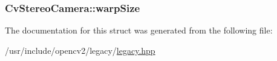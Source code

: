 \hypertarget{structCvStereoCamera_a16dc53a1985f186e6dbc225a1d2c4682}{
\subsubsection[{warp\-Size}]{ Cv\-Stereo\-Camera\-::warp\-Size}}\label{structCvStereoCamera_a16dc53a1985f186e6dbc225a1d2c4682}


The documentation for this struct was generated from the following file\-:\begin{DoxyCompactItemize}
\item 
/usr/include/opencv2/legacy/\hyperlink{legacy_8hpp}{legacy.\-hpp}\end{DoxyCompactItemize}
